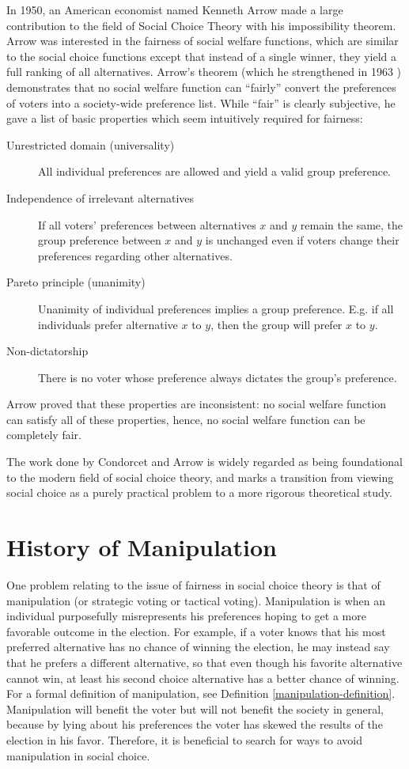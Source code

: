	In 1950, an American economist named Kenneth Arrow made a large contribution to the field of Social Choice Theory with his impossibility theorem. Arrow was interested in the fairness of social welfare functions, which are similar to the social choice functions except that instead of a single winner, they yield a full ranking of all alternatives. Arrow's theorem \cite{arrow1950difficulty} (which he strengthened in 1963 \cite{arrow1963social}) demonstrates that no social welfare function can ``fairly'' convert the preferences of voters into a society-wide preference list. While ``fair'' is clearly subjective, he gave a list of basic properties which seem intuitively required for fairness:
	\begin{description}
		\item[Unrestricted domain (universality)] All individual preferences are allowed and yield a valid group preference.
		\item[Independence of irrelevant alternatives] If all voters' preferences between alternatives $x$ and $y$ remain the same, the group preference between $x$ and $y$ is unchanged even if voters change their preferences regarding other alternatives.
		\item[Pareto principle (unanimity)] Unanimity of individual preferences implies a group preference. E.g. if all individuals prefer alternative $x$ to $y$, then the group will prefer $x$ to $y$.
		\item[Non-dictatorship] There is no voter whose preference always dictates the group's preference.
	\end{description}
	Arrow proved that these properties are inconsistent: no social welfare function can satisfy all of these properties, hence, no social welfare function can be completely fair.

	The work done by Condorcet and Arrow is widely regarded as being foundational to the modern field of social choice theory, and marks a transition from viewing social choice as a purely practical problem to a more rigorous theoretical study.


\section{History of Manipulation}

	One problem relating to the issue of fairness in social choice theory is that of manipulation (or strategic voting or tactical voting). Manipulation is when an individual purposefully misrepresents his preferences hoping to get a more favorable outcome in the election. For example, if a voter knows that his most preferred alternative has no chance of winning the election, he may instead say that he prefers a different alternative, so that even though his favorite alternative cannot win, at least his second choice alternative has a better chance of winning. For a formal definition of manipulation, see Definition \ref{manipulation-definition}. Manipulation will benefit the voter but will not benefit the society in general, because by lying about his preferences the voter has skewed the results of the election in his favor. Therefore, it is beneficial to search for ways to avoid manipulation in social choice.

